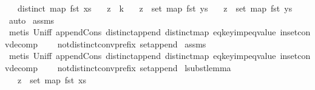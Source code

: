 \begin{isabellebody}
\ \ \ {\isachardoublequoteopen}distinct\ {\isacharparenleft}{\kern0pt}map\ fst\ xs{\isacharparenright}{\kern0pt}{\isachardoublequoteclose}\isanewline
\ \ \ {\isachardoublequoteopen}z\ {\isacharequal}{\kern0pt}\ k{\isachardoublequoteclose}\isanewline
\ \ \ {\isachardoublequoteopen}z\ {\isasymnotin}\ set\ {\isacharparenleft}{\kern0pt}map\ fst\ ys{}{\isacharparenright}{\kern0pt}{\isachardoublequoteclose}\isanewline
\ \ \ {\isachardoublequoteopen}z\ {\isasymnotin}\ set\ {\isacharparenleft}{\kern0pt}map\ fst\ ys{}{\isacharparenright}{\kern0pt}{\isachardoublequoteclose}\isanewline
%
\isadelimproof
%
\endisadelimproof
%
\isatagproof
{}\isamarkupfalse%
\ auto\isanewline
{}\isamarkupfalse%
\ assms\isanewline
{}\isamarkupfalse%
\ {\isacharparenleft}{\kern0pt}metis\ Un{\isacharunderscore}{\kern0pt}iff\ append{\isacharunderscore}{\kern0pt}Cons\ distinct{\isacharunderscore}{\kern0pt}append\ distinct{\isacharunderscore}{\kern0pt}map\ eq{\isacharunderscore}{\kern0pt}key{\isacharunderscore}{\kern0pt}imp{\isacharunderscore}{\kern0pt}eq{\isacharunderscore}{\kern0pt}value\ in{\isacharunderscore}{\kern0pt}set{\isacharunderscore}{\kern0pt}conv{\isacharunderscore}{\kern0pt}decomp\isanewline
\ \ \ \ not{\isacharunderscore}{\kern0pt}distinct{\isacharunderscore}{\kern0pt}conv{\isacharunderscore}{\kern0pt}prefix\ set{\isacharunderscore}{\kern0pt}append{\isacharparenright}{\kern0pt}\isanewline
{}\isamarkupfalse%
\ assms\isanewline
{}\isamarkupfalse%
\ {\isacharparenleft}{\kern0pt}metis\ Un{\isacharunderscore}{\kern0pt}iff\ append{\isacharunderscore}{\kern0pt}Cons\ distinct{\isacharunderscore}{\kern0pt}append\ distinct{\isacharunderscore}{\kern0pt}map\ eq{\isacharunderscore}{\kern0pt}key{\isacharunderscore}{\kern0pt}imp{\isacharunderscore}{\kern0pt}eq{\isacharunderscore}{\kern0pt}value\ in{\isacharunderscore}{\kern0pt}set{\isacharunderscore}{\kern0pt}conv{\isacharunderscore}{\kern0pt}decomp\isanewline
\ \ \ \ not{\isacharunderscore}{\kern0pt}distinct{\isacharunderscore}{\kern0pt}conv{\isacharunderscore}{\kern0pt}prefix\ set{\isacharunderscore}{\kern0pt}append{\isacharparenright}{\kern0pt}\isanewline
{}\isamarkupfalse%
%
\endisatagproof
{\isafoldproof}%
%
\isadelimproof
\isanewline
%
\endisadelimproof
\isanewline
\isanewline
{}\isamarkupfalse%
\ lsubst{\isacharunderscore}{\kern0pt}lemma{}{\isacharcolon}{\kern0pt}\isanewline
\ \ \ {\isachardoublequoteopen}z\ {\isasymin}\ set\ {\isacharparenleft}{\kern0pt}map\ fst\ xs{\isacharparenright}{\kern0pt}{\isachardoublequoteclose}\isanewline

\end{isabellebody}
